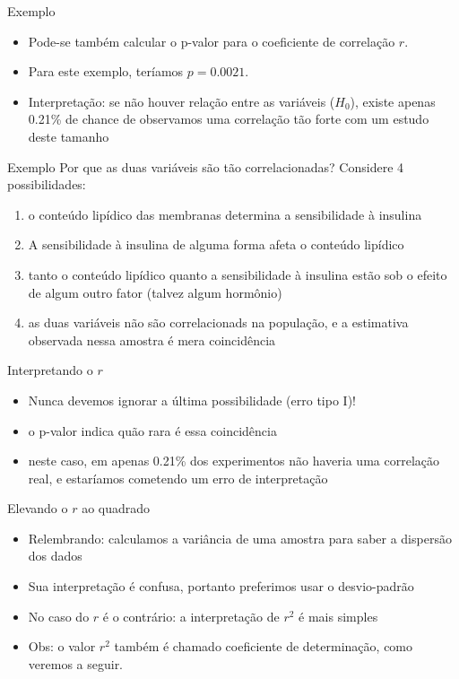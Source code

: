 \documentclass{beamer}
\begin{document}
\begin{frame}{Exemplo}
  \begin{itemize}
  \item Pode-se também calcular o p-valor para o coeficiente de
    correlação $r$.
  \item Para este exemplo, teríamos $p=0.0021$.
  \item Interpretação: se não houver relação entre as variáveis
    ($H_0$), existe apenas 0.21\% de chance de observamos uma
    correlação tão forte com um estudo deste tamanho
  \end{itemize}
\end{frame}

\begin{frame}{Exemplo}
  Por que as duas variáveis são tão correlacionadas? Considere 4
  possibilidades:
  \begin{enumerate}
  \item o conteúdo lipídico das membranas \alert<1>{determina} a
    sensibilidade à insulina
  \item A sensibilidade à insulina de alguma forma afeta o conteúdo lipídico
  \item tanto o conteúdo lipídico quanto a sensibilidade à insulina
    estão sob o efeito de \alert<3>{algum outro} fator (talvez algum hormônio)
  \item as duas variáveis não são correlacionads na população, e a
    estimativa observada nessa amostra é mera coincidência
  \end{enumerate}
\end{frame}

\begin{frame}{Interpretando o $r$}
  \begin{itemize}
  \item Nunca devemos ignorar a última possibilidade (erro tipo I)!
  \item o p-valor indica quão rara é essa coincidência
  \item neste caso, em apenas 0.21\% dos experimentos não haveria uma
    correlação real, e estaríamos cometendo um erro de interpretação
  \end{itemize}
\end{frame}

\begin{frame}{Elevando o $r$ ao quadrado}
  \begin{itemize}
  \item Relembrando: calculamos a variância de uma amostra para saber
    a dispersão dos dados
  \item Sua interpretação é confusa, portanto preferimos usar o
    desvio-padrão
  \item No caso do $r$ é o contrário: a interpretação de $r^2$ é mais simples
  \item Obs: o valor $r^2$ também é chamado \alert{coeficiente de
      determinação}, como veremos a seguir.
  \end{itemize}
\end{frame}
\end{document}
